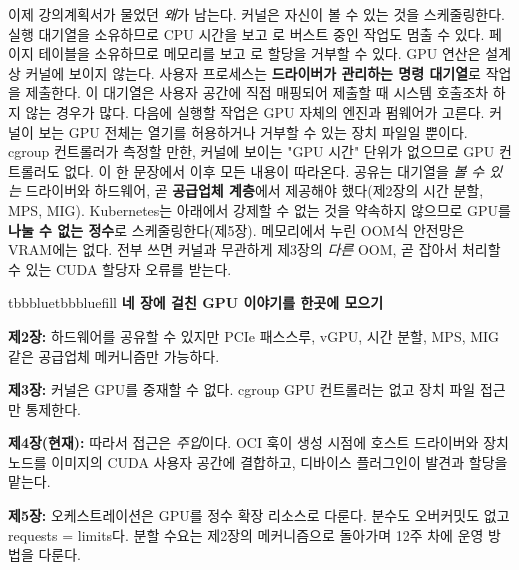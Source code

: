 이제 강의계획서가 물었던 \textit{왜}가 남는다. 커널은 자신이 볼 수 있는 것을 스케줄링한다. 실행 대기열을 소유하므로 CPU 시간을 보고 로 버스트 중인 작업도 멈출 수 있다. 페이지 테이블을 소유하므로 메모리를 보고 로 할당을 거부할 수 있다. GPU 연산은 설계상 커널에 보이지 않는다. 사용자 프로세스는 \textbf{드라이버가 관리하는 명령 대기열}로 작업을 제출한다. 이 대기열은 사용자 공간에 직접 매핑되어 제출할 때 시스템 호출조차 하지 않는 경우가 많다. 다음에 실행할 작업은 GPU 자체의 엔진과 펌웨어가 고른다. 커널이 보는 GPU 전체는 열기를 허용하거나 거부할 수 있는 장치 파일일 뿐이다. cgroup 컨트롤러가 측정할 만한, 커널에 보이는 "GPU 시간" 단위가 없으므로 GPU 컨트롤러도 없다. 이 한 문장에서 이후 모든 내용이 따라온다. 공유는 대기열을 \textit{볼 수 있는} 드라이버와 하드웨어, 곧 \textbf{공급업체 계층}에서 제공해야 했다(제2장의 시간 분할, MPS, MIG). Kubernetes는 아래에서 강제할 수 없는 것을 약속하지 않으므로 GPU를 \textbf{나눌 수 없는 정수}로 스케줄링한다(제5장). 메모리에서 누린 OOM식 안전망은 VRAM에는 없다. 전부 쓰면 커널과 무관하게 제3장의 \textit{다른} OOM, 곧 잡아서 처리할 수 있는 CUDA 할당자 오류를 받는다.

\begin{calloutbox}{tbbblue}{tbbbluefill}
{\normalsize\bfseries\color{tbbblue}네 장에 걸친 GPU 이야기를 한곳에 모으기}\par\vspace{3pt}
\begin{tbbitemize}
  \item \textbf{제2장:} 하드웨어를 공유할 수 있지만 PCIe 패스스루, vGPU, 시간 분할, MPS, MIG 같은 공급업체 메커니즘만 가능하다.
  \item \textbf{제3장:} 커널은 GPU를 중재할 수 없다. cgroup GPU 컨트롤러는 없고 장치 파일 접근만 통제한다.
  \item \textbf{제4장(현재):} 따라서 접근은 \textit{주입}이다. OCI 훅이 생성 시점에 호스트 드라이버와 장치 노드를 이미지의 CUDA 사용자 공간에 결합하고, 디바이스 플러그인이 발견과 할당을 맡는다.
  \item \textbf{제5장:} 오케스트레이션은 GPU를 정수 확장 리소스로 다룬다. 분수도 오버커밋도 없고 requests = limits다. 분할 수요는 제2장의 메커니즘으로 돌아가며 12주 차에 운영 방법을 다룬다.
\end{tbbitemize}
\end{calloutbox}

\vspace{3.0pt}

